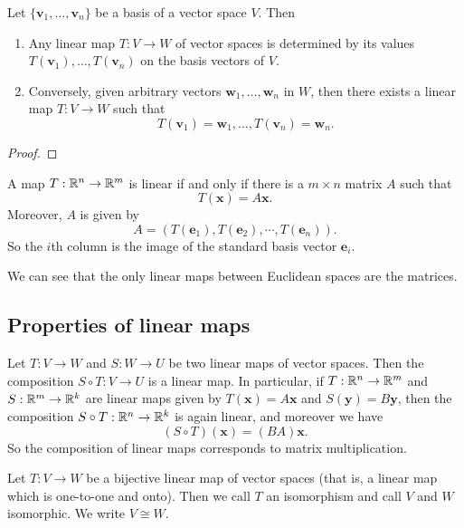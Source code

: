 \documentclass[10pt, a4paper]{article}
\newcommand{\mbf}[1]{\mathbf{#1}}
\begin{document}
\begin{lemma}
    Let $\{\mbf{v}_1, \dotsc, \mbf{v}_n\}$ be a basis of a vector space $V$.
    Then
    \begin{enumerate}[label = (\roman*)]
        \item Any linear map $T : V \rightarrow W$ of vector spaces is determined by its values $T(\mbf{v}_1), \dotsc, T(\mbf{v}_n)$ on the basis vectors of $V$.
        \item Conversely,
        given arbitrary vectors $\mbf{w}_1, \dotsc, \mbf{w}_n$ in $W$,
        then there exists a linear map $T : V \rightarrow W$ such that
        \[
        T(\mbf{v}_1) = \mbf{w}_1, \dotsc, T(\mbf{v}_n) = \mbf{w}_n.
        \]
    \end{enumerate}
    \begin{proof}
        
    \end{proof}
\end{lemma}

\begin{lemma}
    A map $T : \mathbb{R} ^ n \rightarrow \mathbb{R} ^ m$ is linear if and only if there is a $m \times n$ matrix $A$ such that
    \[
    T(\mbf{x}) = A\mbf{x}.
    \]
    Moreover,
    $A$ is given by
    \[
    A = (T(\mbf{e}_1), T(\mbf{e}_2), \dotsi, T(\mbf{e}_n)).
    \]
    So the $i$th column is the image of the standard basis vector $\mbf{e}_i$.
\end{lemma}

We can see that the only linear maps between Euclidean spaces are the matrices.

\subsection{Properties of linear maps}
\begin{lemma}
    Let $T : V \rightarrow W$ and $S : W \rightarrow U$ be two linear maps of vector spaces.
    Then the composition $S \circ T : V \rightarrow U$ is a linear map.
    In particular,
    if $T : \mathbb{R} ^ n \rightarrow \mathbb{R} ^ m$ and $S : \mathbb{R} ^ m \rightarrow \mathbb{R} ^ k$ are linear maps given by $T(\mbf{x}) = A\mbf{x}$ and $S(\mbf{y}) = B\mbf{y}$,
    then the composition $S \circ T : \mathbb{R} ^ n \rightarrow \mathbb{R} ^ k$ is again linear,
    and moreover we have
    \[
    (S \circ T)(\mbf{x}) = (BA)\mbf{x}.
    \]
    So the composition of linear maps corresponds to matrix multiplication.
\end{lemma}

\begin{definition}[Isomorphism]
    Let $T : V \rightarrow W$ be a bijective linear map of vector spaces
    (that is,
    a linear map which is one-to-one and onto).
    Then we call $T$ an isomorphism and call $V$ and $W$ isomorphic.
    We write $V \cong W$.
\end{definition}
\end{document}
